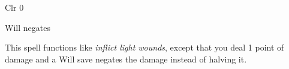 
\begin{description*}
\item[Level:] Clr 0
\item[Saving Throw:] Will negates
\end{description*}

This spell functions like \textit{inflict light wounds}, except that you deal 1
point of damage and a Will save negates the damage instead of halving it.